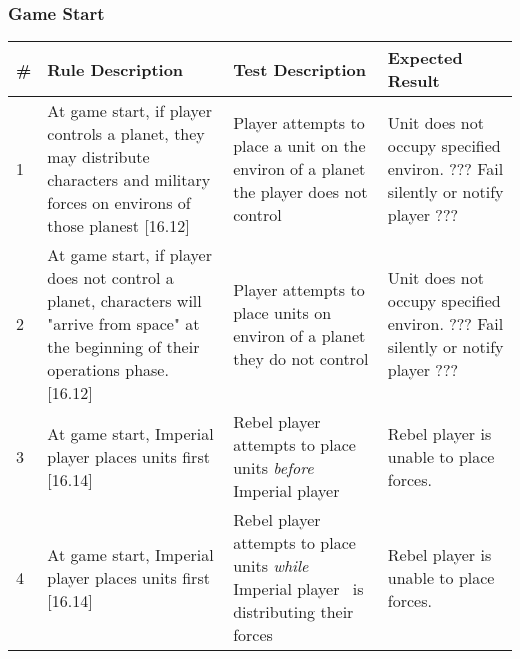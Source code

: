 \subsubsection{Game Start}
\begin{center}

  \begin{longtable}{| p{.5cm} | p{4.5cm} | p{4.5cm} | p{4.5cm} |}
    \hline
    \textbf{\#}&
    \textbf{Rule Description}&
    \textbf{Test Description}&
    \textbf{Expected Result}
    \\ \hline
    
    1 &

    At game start, if player controls a planet, they may distribute
    characters and military forces on environs of those planest
    [16.12] &

    Player attempts to place a unit on the environ of a planet the
    player does not control &

    Unit does not occupy specified environ.  ??? Fail silently or
    notify player ???

    \\ \hline

    2 &

    At game start, if player does not control a planet, characters
    will "arrive from space" at the beginning of their operations
    phase. [16.12] &

    Player attempts to place units on environ of a planet they do not
    control &

    Unit does not occupy specified environ.  ??? Fail silently or
    notify player ???

    \\ \hline 

    3 &

    At game start, Imperial player places units first [16.14] &

    Rebel player attempts to place units \textit{before} Imperial
    player &

    Rebel player is unable to place forces.

    \\ \hline

    4 &

    At game start, Imperial player places units first [16.14] &

    Rebel player attempts to place units \textit{while} Imperial
    player \ is distributing their forces &

    Rebel player is unable to place forces.
    

\end{longtable}
\end{center}
